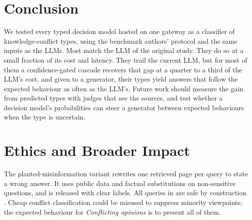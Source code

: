 \section{Conclusion}
\label{sec:conclusion}

We tested every typed decision model hosted on one gateway as a classifier of knowledge-conflict types, using
the benchmark authors' protocol and the same inputs as the LLMs. Most match the LLM of the original study. They do
so at a small fraction of its cost and latency. They trail the
current LLM, but for most of them a confidence-gated cascade recovers that gap at a quarter to a third of the LLM's
cost, and given to a generator, their types yield answers that follow the expected behaviour as often as the LLM's.
 Future work should measure the gain from predicted types with judges that see the
sources, and test whether a decision model's probabilities can steer a generator between expected behaviours when
the type is uncertain.

\section*{Ethics and Broader Impact}

The planted-misinformation variant rewrites one retrieved page per query to state a wrong answer. It uses public data and factual substitutions on
non-sensitive questions, and is released with clear labels. All queries in \conflicts are safe by construction \citep{cattan2025dragged}. Cheap conflict
classification could be misused to suppress minority viewpoints; the expected behaviour for \emph{Conflicting
opinions} is to present all of them.
